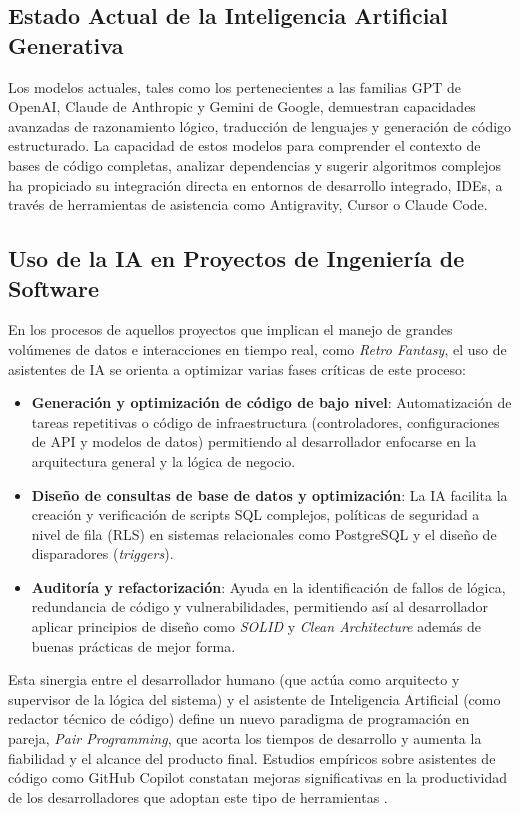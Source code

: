 \subsection{Estado Actual de la Inteligencia Artificial Generativa}
Los modelos actuales, tales como los pertenecientes a las familias GPT de OpenAI, Claude de Anthropic y Gemini de Google, demuestran capacidades avanzadas de razonamiento lógico, traducción de lenguajes y generación de código estructurado. La capacidad de estos modelos para comprender el contexto de bases de código completas, analizar dependencias y sugerir algoritmos complejos ha propiciado su integración directa en entornos de desarrollo integrado, IDEs, a través de herramientas de asistencia como Antigravity, Cursor o Claude Code.

\subsection{Uso de la IA en Proyectos de Ingeniería de Software}
En los procesos de aquellos proyectos que implican el manejo de grandes volúmenes de datos e interacciones en tiempo real, como \textit{Retro Fantasy}, el uso de asistentes de IA se orienta a optimizar varias fases críticas de este proceso:
\begin{itemize}
    \item \textbf{Generación y optimización de código de bajo nivel}: Automatización de tareas repetitivas o código de infraestructura (controladores, configuraciones de API y modelos de datos) permitiendo al desarrollador enfocarse en la arquitectura general y la lógica de negocio.
    \item \textbf{Diseño de consultas de base de datos y optimización}: La IA facilita la creación y verificación de scripts SQL complejos, políticas de seguridad a nivel de fila (RLS) en sistemas relacionales como PostgreSQL y el diseño de disparadores (\textit{triggers}).
    \item \textbf{Auditoría y refactorización}: Ayuda en la identificación de fallos de lógica, redundancia de código y vulnerabilidades, permitiendo así al desarrollador aplicar principios de diseño como \textit{SOLID} y \textit{Clean Architecture} además de buenas prácticas de mejor forma.
\end{itemize}

Esta sinergia entre el desarrollador humano (que actúa como arquitecto y supervisor de la lógica del sistema) y el asistente de Inteligencia Artificial (como redactor técnico de código) define un nuevo paradigma de programación en pareja, \textit{Pair Programming}, que acorta los tiempos de desarrollo y aumenta la fiabilidad y el alcance del producto final. Estudios empíricos sobre asistentes de código como GitHub Copilot constatan mejoras significativas en la productividad de los desarrolladores que adoptan este tipo de herramientas \cite{peng_copilot}.